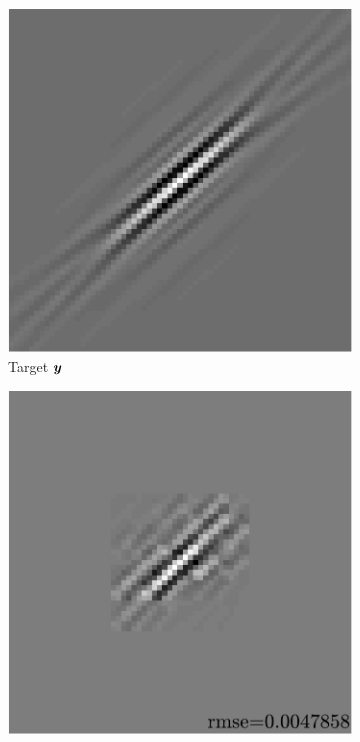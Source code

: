 \begin{figure}[!ht]\centering
\begin{subfigure}[b]{0.49\textwidth}\centering
\includegraphics[width=\linewidth]{figures/xp/n4/xp_128x128_sc2_angl1_K3_S3_node4_target.pdf}
\caption{Target $\bm{y}$}
\end{subfigure}
\begin{subfigure}[b]{0.49\linewidth}\centering
\includegraphics[width=\linewidth]{figures/xp/n4/xp_128x128_sc2_angl1_K3_S3_node4_approx.pdf}

\end{subfigure}
\end{figure}
